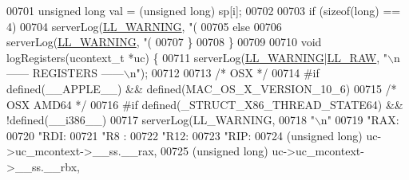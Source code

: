 \begin{DoxyCode}
{{{{{{{{{{{{{{{{{{{{{{{{{{{{{{{{{{{{{{{{{{00701         \textcolor{keywordtype}{unsigned} \textcolor{keywordtype}{long} val = (\textcolor{keywordtype}{unsigned} \textcolor{keywordtype}{long}) sp[i];
00702 
00703         \textcolor{keywordflow}{if} (\textcolor{keyword}{sizeof}(\textcolor{keywordtype}{long}) == 4)
00704             serverLog(\hyperlink{server_8h_a31229b9334bba7d6be2a72970967a14b}{LL\_WARNING}, \textcolor{stringliteral}{"(%
00705         \textcolor{keywordflow}{else}
00706             serverLog(\hyperlink{server_8h_a31229b9334bba7d6be2a72970967a14b}{LL\_WARNING}, \textcolor{stringliteral}{"(%
00707     \}
00708 \}
00709 
00710 \textcolor{keywordtype}{void} logRegisters(ucontext\_t *uc) \{
00711     serverLog(\hyperlink{server_8h_a31229b9334bba7d6be2a72970967a14b}{LL\_WARNING}|\hyperlink{server_8h_a6b3768a4d2dfb3ac580b8d999baa9350}{LL\_RAW}, \textcolor{stringliteral}{"\(\backslash\)n------ REGISTERS ------\(\backslash\)n"});
00712 
00713 \textcolor{comment}{/* OSX */}
00714 \textcolor{preprocessor}{#}\textcolor{preprocessor}{if} \textcolor{preprocessor}{defined}\textcolor{preprocessor}{(}\textcolor{preprocessor}{\_\_APPLE\_\_}\textcolor{preprocessor}{)} \textcolor{preprocessor}{&&} \textcolor{preprocessor}{defined}\textcolor{preprocessor}{(}\textcolor{preprocessor}{MAC\_OS\_X\_VERSION\_10\_6}\textcolor{preprocessor}{)}
00715   \textcolor{comment}{/* OSX AMD64 */}
00716     \textcolor{preprocessor}{#}\textcolor{preprocessor}{if} \textcolor{preprocessor}{defined}\textcolor{preprocessor}{(}\textcolor{preprocessor}{\_STRUCT\_X86\_THREAD\_STATE64}\textcolor{preprocessor}{)} \textcolor{preprocessor}{&&} \textcolor{preprocessor}{!}\textcolor{preprocessor}{defined}\textcolor{preprocessor}{(}\textcolor{preprocessor}{\_\_i386\_\_}\textcolor{preprocessor}{)}
00717     serverLog(LL\_WARNING,
00718     \textcolor{stringliteral}{"\(\backslash\)n"}
00719     \textcolor{stringliteral}{"RAX:%
00720     \textcolor{stringliteral}{"RDI:%
00721     \textcolor{stringliteral}{"R8 :%
00722     \textcolor{stringliteral}{"R12:%
00723     \textcolor{stringliteral}{"RIP:%
00724         (\textcolor{keywordtype}{unsigned} \textcolor{keywordtype}{long}) uc->uc\_mcontext->\_\_ss.\_\_rax,
00725         (\textcolor{keywordtype}{unsigned} \textcolor{keywordtype}{long}) uc->uc\_mcontext->\_\_ss.\_\_rbx,
}}}}}}}}}}}}}}}}}}}}}}}}}}}}}}}}}}}}}}}}}}}}}}}}}
\end{DoxyCode}
